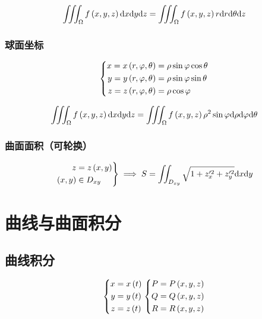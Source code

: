 \documentclass{article}
\begin{document}
\[
    \iiint_\Omega f\left(x,y,z\right)\mathrm d x\mathrm d y\mathrm d z=
    \iiint_\Omega f\left(x,y,z\right)r\mathrm d r\mathrm d\theta\mathrm d z\]

\subsubsection{球面坐标}

\[\left\{\begin{aligned}
        x=x\left(r,\varphi,\theta\right) & =\rho\sin\varphi\cos\theta \\
        y=y\left(r,\varphi,\theta\right) & =\rho\sin\varphi\sin\theta \\
        z=z\left(r,\varphi,\theta\right) & =\rho\cos\varphi           \\
    \end{aligned}\right.\]

\[
    \iiint_\Omega f\left(x,y,z\right)\mathrm d x\mathrm d y\mathrm d z=
    \iiint_\Omega f\left(x,y,z\right)\rho^2\sin\varphi\mathrm d\rho\mathrm d\varphi\mathrm d\theta\]

\subsubsection{曲面面积（可轮换）}

\[\left.\begin{aligned}
        z       & =z\left(x,y\right)  \\
        \left(x,y\right) & \in D_{xy}
    \end{aligned}\right\}\implies
    S=\iint_{D_{xy}}\sqrt{1+z^{\prime2}_x+z^{\prime2}_y}\mathrm d x\mathrm d y\]

\section{曲线与曲面积分}

\subsection{曲线积分}

\begin{definition}[]
    \[\left\{\begin{aligned}
            x & =x\left(t\right) \\
            y & =y\left(t\right) \\
            z & =z\left(t\right)
        \end{aligned}\right.
        \left\{\begin{aligned}
            P & =P\left(x,y,z\right) \\
            Q & =Q\left(x,y,z\right) \\
            R & =R\left(x,y,z\right)
        \end{aligned}\right.\]
\end{definition}
\end{document}
